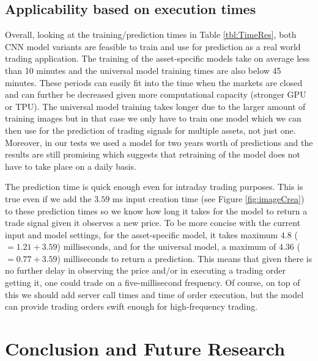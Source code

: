 \documentclass[12pt, a4paper]{article}
\begin{document}
\subsection{Applicability based on execution times}

Overall, looking at the training/prediction times in Table \ref{tbl:TimeRes}, both CNN model variants are feasible to train and use for prediction as a real world trading application. The training of the asset-specific models take on average less than 10 minutes and the universal model training times are also below 45 minutes. These periods can easily fit into the time when the markets are closed and can further be decreased given more computational capacity (stronger GPU or TPU). The universal model training takes longer due to the larger amount of training images but in that case we only have to train one model which we can then use for the prediction of trading signals for multiple assets, not just one.
Moreover, in our tests we used a model for two years worth of predictions and the results are still promising which suggests that retraining of the model does not have to take place on a daily basis. 

The prediction time is quick enough even for intraday trading purposes. This is true even if we add the $3.59$ ms input creation time (see Figure \ref{fig:imageCrea}) to these prediction times so we know how long it takes for the model to return a trade signal given it observes a new price. To be more concise with the current input and model settings, for the asset-specific model, it takes maximum $4.8$ ($=1.21 + 3.59$) milliseconds, and for the universal model, a maximum of $4.36$ ($=0.77 + 3.59$) milliseconds to return a prediction. This means that given there is no further delay in observing the price and/or in executing a trading order getting it, one could trade on a five-millisecond frequency. Of course, on top of this we should add server call times and time of order execution, but the model can provide trading orders swift enough for high-frequency trading.

\section{Conclusion and Future Research}
\label{sec:Conclusion}
\end{document}
